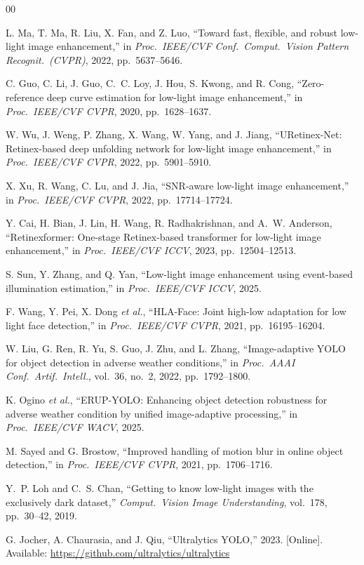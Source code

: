 \documentclass[conference]{IEEEtran}
\begin{document}
\begin{thebibliography}{00}

L. Ma, T. Ma, R. Liu, X. Fan, and Z. Luo, ``Toward fast, flexible, and
robust low-light image enhancement,'' in \textit{Proc.\ IEEE/CVF Conf.\
Comput.\ Vision Pattern Recognit.\ (CVPR)}, 2022, pp.\ 5637--5646.

C. Guo, C. Li, J. Guo, C.\ C. Loy, J. Hou, S. Kwong, and R. Cong,
``Zero-reference deep curve estimation for low-light image enhancement,''
in \textit{Proc.\ IEEE/CVF CVPR}, 2020, pp.\ 1628--1637.

W. Wu, J. Weng, P. Zhang, X. Wang, W. Yang, and J. Jiang,
``URetinex-Net: Retinex-based deep unfolding network for low-light image
enhancement,'' in \textit{Proc.\ IEEE/CVF CVPR}, 2022, pp.\ 5901--5910.

X. Xu, R. Wang, C. Lu, and J. Jia, ``SNR-aware low-light image
enhancement,'' in \textit{Proc.\ IEEE/CVF CVPR}, 2022,
pp.\ 17714--17724.

Y. Cai, H. Bian, J. Lin, H. Wang, R. Radhakrishnan, and A.\ W. Anderson,
``Retinexformer: One-stage Retinex-based transformer for low-light image
enhancement,'' in \textit{Proc.\ IEEE/CVF ICCV}, 2023,
pp.\ 12504--12513.

S. Sun, Y. Zhang, and Q. Yan, ``Low-light image enhancement using
event-based illumination estimation,'' in \textit{Proc.\ IEEE/CVF ICCV},
2025.

F. Wang, Y. Pei, X. Dong \textit{et al.}, ``HLA-Face: Joint high-low
adaptation for low light face detection,'' in \textit{Proc.\ IEEE/CVF
CVPR}, 2021, pp.\ 16195--16204.

W. Liu, G. Ren, R. Yu, S. Guo, J. Zhu, and L. Zhang,
``Image-adaptive YOLO for object detection in adverse weather
conditions,'' in \textit{Proc.\ AAAI Conf.\ Artif.\ Intell.}, vol.\ 36,
no.\ 2, 2022, pp.\ 1792--1800.

K. Ogino \textit{et al.}, ``ERUP-YOLO: Enhancing object detection
robustness for adverse weather condition by unified image-adaptive
processing,'' in \textit{Proc.\ IEEE/CVF WACV}, 2025.

M. Sayed and G. Brostow, ``Improved handling of motion blur in online
object detection,'' in \textit{Proc.\ IEEE/CVF CVPR}, 2021,
pp.\ 1706--1716.

Y.\ P. Loh and C.\ S. Chan, ``Getting to know low-light images with the
exclusively dark dataset,'' \textit{Comput.\ Vision Image Understanding},
vol.\ 178, pp.\ 30--42, 2019.

G. Jocher, A. Chaurasia, and J. Qiu, ``Ultralytics YOLO,'' 2023.
[Online]. Available: \url{https://github.com/ultralytics/ultralytics}

\end{thebibliography}
\end{document}
